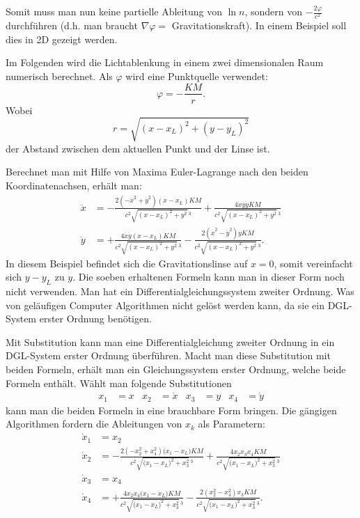 \begin{refsection}
Somit muss man nun keine partielle Ableitung von \(\ln n\), sondern von
\(-\frac{2\varphi}{c^2}\) durchführen (d.h. man braucht
\(\nabla\varphi=\) Gravitationskraft).  In einem Beispiel soll dies in
2D gezeigt werden.

\begin{beispiel}
  Im Folgenden wird die Lichtablenkung in einem zwei dimensionalen
  Raum numerisch berechnet.  Als \(\varphi\) wird eine Punktquelle
  verwendet:
  \begin{equation*}
    \varphi = -\frac{KM}{r}.
  \end{equation*}
  Wobei
  \begin{equation*}
    r = \sqrt{(x-x_L)^2+(y-y_L)^2}
  \end{equation*}
  der Abstand zwischen dem aktuellen Punkt und der Linse ist.

  Berechnet man mit Hilfe von Maxima Euler-Lagrange nach den beiden
  Koordinatenachsen, erhält man:
  \begin{align*}
    \ddot{x} &= -\frac{2(-\dot{x}^2+\dot{y}^2)(x-x_L)KM}
               {c^2\sqrt{(x-x_L)^2+y^2}\,^3}+
               \frac{4\dot{x}y\dot{y}KM}{c^2\sqrt{(x-x_L)^2+y^2}\,^3}\\
    \ddot{y} &= +\frac{4\dot{x}\dot{y}(x-x_L)KM}{c^2\sqrt{(x-x_L)^2+y^2}\,^3}
               - \frac{2(\dot{x}^2-\dot{y}^2)yKM}
               {c^2\sqrt{(x-x_L)^2+y^2}\,^3}.
  \end{align*}
  In diesem Beispiel befindet sich die Gravitationslinse auf \(x=0\),
  somit vereinfacht sich \(y-y_L\) zu \(y\).  Die soeben erhaltenen
  Formeln kann man in dieser Form noch nicht verwenden.  Man hat ein
  Differentialgleichungssystem zweiter Ordnung.  Was von geläufigen
  Computer Algorithmen nicht gelöst werden kann, da sie ein DGL-System
  erster Ordnung benötigen.

  Mit Substitution kann man eine Differentialgleichung zweiter Ordnung
  in ein DGL-System erster Ordnung überführen.  Macht man diese
  Substitution mit beiden Formeln, erhält man ein Gleichungssystem
  erster Ordnung, welche beide Formeln enthält.  Wählt man folgende
  Substitutionen
  \begin{align*}
    x_1 &= x &x_2 &= \dot{x} &x_3 &= y &x_4 &= \dot{y}
  \end{align*}
  kann man die beiden Formeln in eine brauchbare Form bringen.  Die
  gängigen Algorithmen fordern die Ableitungen von \(x_k\) als
  Parametern:
  \begin{align*}
    \dot{x}_1 &= x_2\\
    \dot{x}_2 &= -\frac{2\left(-x_2^2+x_4^2\right)\bigl(x_1-x_L\bigr)KM}
                {c^2\sqrt{\bigl(x_1-x_L\bigr)^2+x_3^2}\,^3}
                + \frac{4 x_2x_3x_4 KM}
                {c^2\sqrt{\bigl(x_1-x_L\bigr)^2+x_3^2}\,^3}\\
    \dot{x}_3 &= x_4\\
    \dot{x}_4 &= +\frac{4x_2x_4\bigl(x_1-x_L\bigr)KM}
                {c^2\sqrt{\bigl(x_1-x_L\bigr)^2+x_3^2}\,^3}
                - \frac{2 \left(x_2^2-x_4^2\right) x_3 KM}
                {c^2\sqrt{\bigl(x_1-x_L\bigr)^2+x_3^2}\,^3}.
  \end{align*}


\end{beispiel}
\end{refsection}
